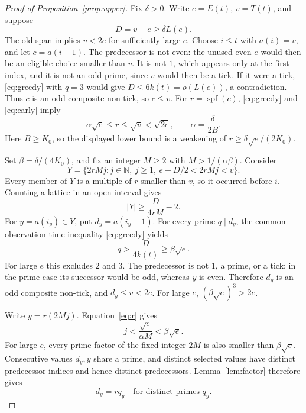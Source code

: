 \documentclass[11pt]{article}
\theoremstyle{remark}
\newcommand{\N}{\mathbb{N}}
\newcommand{\spf}{\operatorname{spf}}
\begin{document}
\begin{proof}[Proof of Proposition~\ref{prop:upper}]

Fix $\delta>0$. %
Write $e=E(t)$, $v=T(t)$, and suppose
\begin{equation}\label{eq:upperbad}
 D=v-e\geq\delta L(e).
\end{equation}
The old span implies $v<2e$ for sufficiently large $e$.
Choose $i\leq t$ with $a(i)=v$, and let $c=a(i-1)$.
The predecessor is not even: the unused even $e$ would then be an
eligible choice smaller than $v$. It is not $1$, which appears
only at the first index, and it is not an odd prime, since $v$
would then be a tick. If it were a tick, \eqref{eq:greedy} with
$q=3$ would give $D\leq6k(t)=o(L(e))$, a contradiction.
Thus $c$ is an odd composite non-tick, so $c\leq v$.
For $r=\spf(c)$, \eqref{eq:greedy} and \eqref{eq:early} imply
\begin{equation}\label{eq:r}
 \alpha\sqrt e\leq r\leq\sqrt v<\sqrt{2e},
 \qquad \alpha=\frac{\delta}{2B}.
\end{equation}
Here $B\geq K_0$, so the displayed lower bound is a weakening
of $r\geq\delta\sqrt e/(2K_0)$.

Set $\beta=\delta/(4K_0)$, and fix an integer
$M\geq2$ with $M>1/(\alpha\beta)$.
Consider
\[
 Y=\{2rMj:j\in\N,\ j\geq1,\ e+D/2<2rMj<v\}.
\]
Every member of $Y$ is a multiple of $r$ smaller than $v$, so it
occurred before $i$. Counting a lattice in an open interval gives
\begin{equation}\label{eq:Yupper}
 |Y|\geq\frac{D}{4rM}-2.
\end{equation}
For $y=a(i_y)\in Y$, put $d_y=a(i_y-1)$.
For every prime $q\mid d_y$, the common observation-time
inequality \eqref{eq:greedy} yields
\[
 q>\frac{D}{4k(t)}\geq\beta\sqrt e.
\]
For large $e$ this excludes $2$ and $3$. The predecessor is not
$1$, a prime, or a tick: in the prime case its successor would
be odd, whereas $y$ is even. Therefore $d_y$ is an odd composite
non-tick, and $d_y\leq v<2e$.
For large $e$, $(\beta\sqrt e)^3>2e$.

Write $y=r(2Mj)$. Equation~\eqref{eq:r} gives
\[
 j<\frac{\sqrt e}{\alpha M}<\beta\sqrt e.
\]
For large $e$, every prime factor of the fixed integer $2M$ is
also smaller than $\beta\sqrt e$. Consecutive values $d_y,y$
share a prime, and distinct selected values have distinct predecessor
indices and hence distinct predecessors. Lemma~\ref{lem:factor}
therefore gives
\begin{equation}\label{eq:du}
 d_y=rq_y\quad\text{for distinct primes }q_y.
\end{equation}


\end{proof}
\end{document}
